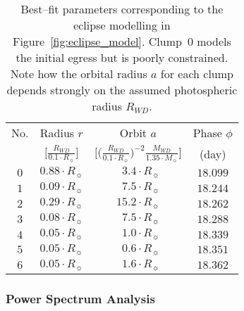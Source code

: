 \documentclass{aa}
\begin{document}
\begin{table}

\caption{Best--fit parameters corresponding to the eclipse modelling in Figure~\ref{fig:eclipse_model}. Clump~0 models the initial egress but is poorly constrained. Note how the orbital radius $a$ for each clump depends strongly on the assumed photospheric radius $R_{WD}$.}             %
\label{tab:eclipse_model}      %
\centering                          %
\begin{tabular}{c c c c}        %
\hline\hline                 %
No. & Radius $r$ & Orbit $a$ & Phase $\phi$ \\    %

 & $\bigg[\frac{R_{WD}}{0.1 \cdot R_\sun} \bigg]$ & $\bigg[\Big(\frac{R_{WD}}{0.1 \cdot R_\sun}\Big)^{-2} \frac{M_{WD}}{1.35 \cdot M_\sun}\bigg]$& (day) \\

\hline                        %
   $0$ & $0.88 \cdot R_\sun$ & $\, \, \, 3.4 \cdot R_\sun$ & $18.099$ \\
   $1$ & $0.09 \cdot R_\sun$ & $\, \, \, 7.5 \cdot R_\sun$ & $18.244$ \\
   $2$ & $0.29 \cdot R_\sun$ & $15.2 \cdot R_\sun$ & $18.262$ \\
   $3$ & $0.08 \cdot R_\sun$ & $\, \, \, 7.5 \cdot R_\sun$ & $18.288$ \\
   $4$ & $0.05 \cdot R_\sun$ & $\, \, \, 1.0 \cdot R_\sun$ & $18.339$ \\
   $5$ & $0.05 \cdot R_\sun$ & $\, \, \,0.6 \cdot R_\sun$ & $18.351$ \\
   $6$ & $0.05 \cdot R_\sun$ & $\, \, \, 1.6 \cdot R_\sun$ & $18.362$ \\
\hline                                   %
\end{tabular}
\end{table}

\subsubsection{Power Spectrum Analysis}
\label{sect:analysis:psd}
\end{document}
